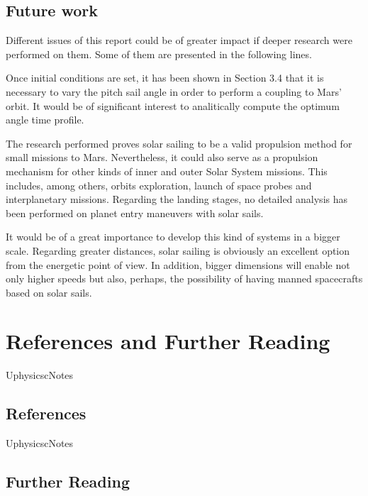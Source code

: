\documentclass[twocolumn,12pt,a4paper]{article}
\numberwithin{equation}{section}
\begin{document}
\subsection{Future work}
Different issues of this report could be of greater impact if deeper research were performed on them. Some of them are presented in the following lines.

Once initial conditions are set, it has been shown in Section 3.4 that it is necessary to vary the pitch sail angle in order to perform a coupling to Mars' orbit. It would be of significant interest to analitically compute the optimum angle time profile.

The research performed proves solar sailing to be a valid propulsion method for small missions to Mars. Nevertheless, it could also serve as a propulsion mechanism for other kinds of inner and outer Solar System missions. This includes, among others, orbits exploration, launch of space probes and interplanetary missions. Regarding the landing stages, no detailed analysis has been performed on planet entry maneuvers with solar sails. 

It would be of a great importance to develop this kind of systems in a bigger scale. Regarding greater distances, solar sailing is obviously an excellent option from the energetic point of view. In addition, bigger dimensions will enable not only higher speeds but also, perhaps, the possibility of having manned spacecrafts based on solar sails.

\clearpage

\appendix
\section{References and Further Reading}

\begin{btSect}{UphysicscNotes}
	
	\subsection*{References}	
	\btPrintCited
\end{btSect}

\begin{btSect}{UphysicscNotes}
	
	\subsection*{Further Reading}	
	\btPrintNotCited
\end{btSect}
\end{document}
